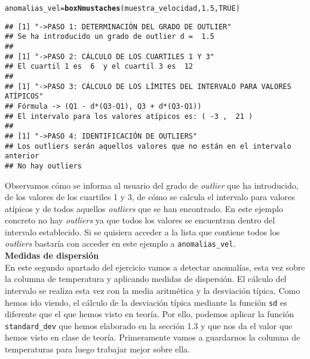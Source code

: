 \documentclass[12pt]{report}\usepackage[]{graphicx}\usepackage[dvipsnames]{xcolor}
\makeatletter
\newcommand{\hlnum}[1]{\textcolor[rgb]{0.686,0.059,0.569}{#1}}%
\newcommand{\hlstd}[1]{\textcolor[rgb]{0.345,0.345,0.345}{#1}}%
\newcommand{\hlkwb}[1]{\textcolor[rgb]{0.69,0.353,0.396}{#1}}%
\newcommand{\hlkwd}[1]{\textcolor[rgb]{0.737,0.353,0.396}{\textbf{#1}}}%
\newenvironment{kframe}{%
 \def\at@end@of@kframe{}%
 \ifinner\ifhmode%
  \def\at@end@of@kframe{\end{minipage}}%
  \begin{minipage}{\columnwidth}%
 \fi\fi%
 \def\FrameCommand##1{\hskip\@totalleftmargin \hskip-\fboxsep
 \colorbox{shadecolor}{##1}\hskip-\fboxsep
     \hskip-\linewidth \hskip-\@totalleftmargin \hskip\columnwidth}%
 \MakeFramed {\advance\hsize-\width
   \@totalleftmargin\z@ \linewidth\hsize
   \@setminipage}}%
 {\par\unskip\endMakeFramed%
 \at@end@of@kframe}
\newenvironment{knitrout}{}{} %
\makeatother
\begin{document}
\begin{knitrout}
\color{fgcolor}\begin{kframe}
\begin{alltt}
\hlstd{anomalias_vel} \hlkwb{=} \hlkwd{boxNmustaches}\hlstd{(muestra_velocidad,} \hlnum{1.5}\hlstd{,} \hlnum{TRUE}\hlstd{)}
\end{alltt}
\begin{verbatim}
## [1] "->PASO 1: DETERMINACIÓN DEL GRADO DE OUTLIER"
## Se ha introducido un grado de outlier d =  1.5 
## 
## [1] "->PASO 2: CÁLCULO DE LOS CUARTILES 1 Y 3"
## El cuartil 1 es  6  y el cuartil 3 es  12 
## 
## [1] "->PASO 3: CÁLCULO DE LOS LÍMITES DEL INTERVALO PARA VALORES ATÍPICOS"
## Fórmula -> (Q1 - d*(Q3-Q1), Q3 + d*(Q3-Q1))
## El intervalo para los valores atípicos es: ( -3 ,  21 )
## 
## [1] "->PASO 4: IDENTIFICACIÓN DE OUTLIERS"
## Los outliers serán aquellos valores que no están en el intervalo anterior
## No hay outliers
\end{verbatim}
\end{kframe}
\end{knitrout}
					
					Observamos cómo se informa al usuario del grado de \textit{outlier} que ha introducido, de los valores de los cuartiles 1 y 3, de cómo se calcula el intervalo para valores atípicos y de todos aquellos \textit{outliers} que se han encontrado. En este ejemplo concreto no hay \textit{outliers} ya que todos los valores se encuentran dentro del intervalo establecido. Si se quisiera acceder a la lista que contiene todos los \textit{outliers} bastaría con acceder en este ejemplo a \texttt{anomalias\_vel}.\\
					
					\textbf{\large{Medidas de dispersión}}\\
					
					En este segundo apartado del ejercicio vamos a detectar anomalías, esta vez sobre la columna de temperatura y aplicando medidas de dispersión. El cálculo del intervalo se realiza esta vez con la media aritmética y la desviación típica. Como hemos ido viendo, el cálculo de la desviación típica mediante la función \texttt{sd} es diferente que el que hemos visto en teoría. Por ello, podemos aplicar la función \texttt{standard\_dev} que hemos elaborado en la sección 1.3 y que nos da el valor que hemos visto en clase de teoría. Primeramente vamos a guardarnos la columna de temperaturas para luego trabajar mejor sobre ella.
					
\end{document}
